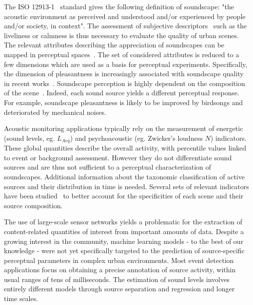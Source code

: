 \documentclass{article}
\begin{document}
\begin{sloppy}
The ISO 12913-1~\cite{iso2014} standard gives the following definition of soundscape: "the acoustic environment as perceived and understood and/or experienced by people and/or society, in context". The assessment of subjective descriptors~\cite{berglund2006, brown2011, aletta2016} such as the liveliness or calmness is thus necessary to evaluate the quality of urban scenes. The relevant attributes describing the appreciation of soundscapes can be mapped in perceptual spaces~\cite{axelsson2010, cain2013}. The set of considered attributes is reduced to a few dimensions which are used as a basis for perceptual experiments. Specifically, the dimension of pleasantness is increasingly associated with soundscape quality in recent works~\cite{decoensel2006, delaitre2014, ricciardi2014, aumond2017}. Soundscape perception is highly dependent on the composition of the scene~\cite{lavandier2006, nilsson2006}. Indeed, each sound source yields a different perceptual response. For example, soundscape pleasantness is likely to be improved by birdsongs and deteriorated by mechanical noises.

Acoustic monitoring applications typically rely on the measurement of energetic (sound levels, eg. $L_{Aeq}$) and psychoacoustic (eg. Zwicker's loudness $N$) indicators. These global quantities describe the overall activity, with percentile values linked to event or background assessment. However they do not differentiate sound sources and are thus not sufficient to a perceptual characterization of soundscapes. Additional information about the taxonomic classification of active sources and their distribution in time is needed. Several sets of relevant indicators have been studied~\cite{can2008, can2016, brocolini2013} to better account for the specificities of each scene and their source composition.

The use of large-scale sensor networks yields a problematic for the extraction of content-related quantities of interest from important amounts of data. Despite a growing interest in the community, machine learning models - to the best of our knowledge - were not yet specifically targeted to the prediction of source-specific perceptual parameters in complex urban environments. Most event detection applications focus on obtaining a precise annotation of source activity, within usual ranges of tens of milliseconds. The estimation of sound levels involves entirely different models through source separation and regression \cite{gloaguen2016} and longer time scales. %


\end{sloppy}
\end{document}
